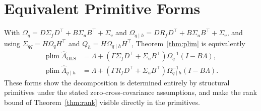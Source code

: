 \documentclass[10pt,twocolumn]{article}
\theoremstyle{remark}
\newcommand{\plim}{\operatorname{plim}}
\begin{document}
\section{Equivalent Primitive Forms}

With $\Omega_q=D\Sigma_fD^\top+B\Sigma_uB^\top+\Sigma_v$ and
$\Omega_{q\mid h}=DR_fD^\top+B\Sigma_uB^\top+\Sigma_v$, and using
$\Sigma_{qq}=H\Omega_qH^\top$ and $Q_h=H\Omega_{q\mid h}H^\top$,
Theorem~\ref{thm:plim} is equivalently
\begin{align}
\plim\widehat\Lambda_{\mathrm{OLS}}
&=\Lambda+(\Gamma\Sigma_fD^\top+\Sigma_uB^\top)\Omega_q^{-1}(I-B\Lambda), \\
\plim\widehat\Lambda_{q\mid h}
&=\Lambda+(\Gamma R_fD^\top+\Sigma_uB^\top)\Omega_{q\mid h}^{-1}(I-B\Lambda).
\end{align}
These forms show the decomposition is determined entirely by structural
primitives under the stated zero-cross-covariance assumptions, and make the
rank bound of Theorem~\ref{thm:rank} visible directly in the primitives.

\begingroup
\small
\setlength{\itemsep}{1pt plus 0.2pt minus 0.2pt}


\endgroup
\end{document}
